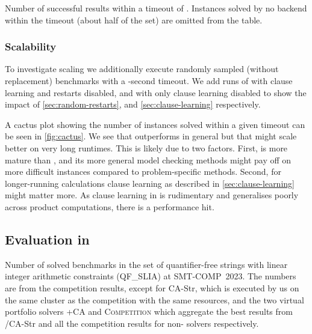 \begin{table}
  \begin{center}
  
  \end{center}
  \caption{Number of successful results within a timeout of \RuntimeTimeout{}.
  Instances solved by no backend within the timeout (about half of the set) are
  omitted from the table.}\label{tab:solve-status}
\end{table}

\subsubsection{Scalability}\label{sec:scaling}%
To investigate scaling we additionally execute  randomly sampled
(without replacement) benchmarks with a -second timeout. We add
runs of \Calculus{} with clause learning and restarts disabled, and with only
clause learning disabled to show the impact of \cref{sec:random-restarts}, and
\cref{sec:clause-learning} respectively.

A cactus plot showing the number of instances solved within a given timeout can
be seen in \cref{fig:cactus}. We see that \Calculus{} outperforms \Nuxmv{} in
general but that \Nuxmv{} might scale better on very long runtimes. This is
likely due to two factors. First, \Nuxmv{} is more mature than \Calculus{}, and
its more general model checking methods might pay off on more difficult
instances compared to problem-specific methods. Second, for longer-running
calculations clause learning as described in \cref{sec:clause-learning} might
matter more. As clause learning in \Catra{} is rudimentary and generalises
poorly across product computations, there is a performance hit.

\subsection{Evaluation in \Ostrich{}}\label{}%

\begin{table}
  \begin{center}
  
  \end{center}
  \caption{Number of solved benchmarks in the set of quantifier-free strings with
    linear integer arithmetic constraints (QF\_SLIA) at SMT-COMP~2023. The numbers are from
    the competition results, except for CA-Str, which is executed by us on the same 
    cluster as the competition with the same resources, and the two virtual portfolio solvers
    \Ostrich+CA and \textsc{Competition} which aggregate the best results from \Ostrich{}/CA-Str and 
    all the competition results for non-\Ostrich{} solvers respectively. }
  \label{tab:solve-status-smt-comp}
\end{table}

